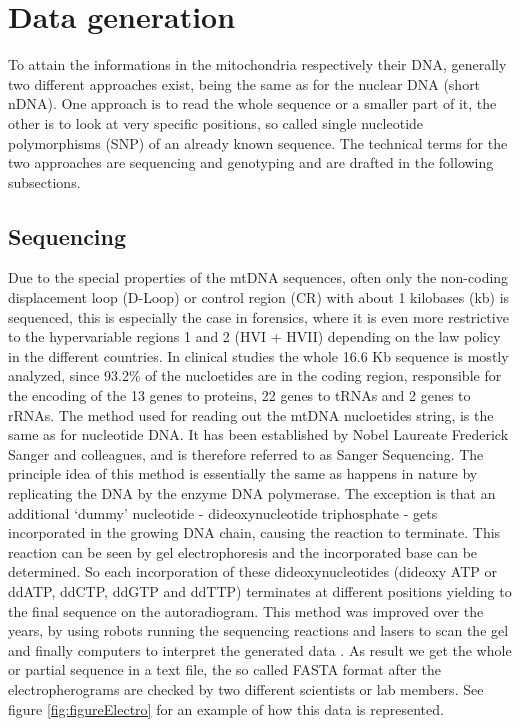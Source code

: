 \section{Data generation}
\label{sec:dataGeneration}
To attain the informations in the mitochondria respectively their DNA, generally two different approaches exist, being the same as for the nuclear DNA (short nDNA). One approach is to read the whole sequence or a smaller part of it, the other is to look at very specific positions, so called single nucleotide polymorphisms (SNP) of an already known sequence. The technical terms for the two approaches are sequencing and genotyping and are drafted in the following subsections.
\subsection{Sequencing}Due to the special properties of the mtDNA sequences, often only the non-coding displacement loop (D-Loop) or control region (CR) with about 1 kilobases (kb) is sequenced, this is especially the case in forensics, where it is even more restrictive to the hypervariable regions 1 and 2 (HVI + HVII) depending on the law policy in the different countries. In clinical studies the whole 16.6 Kb sequence is mostly analyzed, since 93.2\% of the nucloetides are in the coding region, responsible for the encoding of the 13 genes to proteins, 22 genes to tRNAs and 2 genes to rRNAs\cite{Sosa2012}. The method used for reading out the mtDNA nucloetides string, is the same as for nucleotide DNA. It has been established by Nobel Laureate Frederick Sanger and colleagues, and is therefore referred to as Sanger Sequencing. The principle idea of this method is essentially the same as happens in nature by replicating the DNA by the enzyme DNA polymerase.
The exception is that an additional `dummy' nucleotide - dideoxynucleotide triphosphate - gets incorporated in the growing DNA chain, causing the reaction to terminate. This reaction can be seen by gel electrophoresis and the incorporated base can be determined. So each incorporation of these dideoxynucleotides (dideoxy ATP or ddATP, ddCTP, ddGTP and ddTTP) terminates at different positions yielding to the final sequence on the autoradiogram.
This method was improved over the years, by using robots running the sequencing reactions and lasers to scan the gel and finally computers to interpret the generated data \cite{WallaceRobertA.SandersGeraldP.1996}. As result we get the whole or partial sequence in a text file, the so called FASTA format after the electropherograms are checked by two different scientists or lab members\cite{Weissensteiner2010}. See figure \ref{fig:figureElectro} for an example of how this data is represented. 
